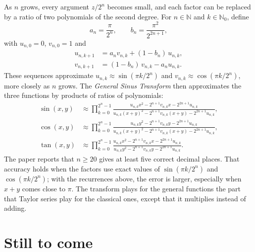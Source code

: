 As $n$ grows, every argument $z/2^n$ becomes small, and each factor can be replaced by a ratio of two polynomials of the second degree. For $n \in \mathbb{N}$ and $k \in \mathbb{N}_0$, define
\begin{equation}
a_n = \frac{\pi}{2^n}, \qquad b_n = \frac{\pi^2}{2^{2n+1}},
\end{equation}
with $u_{n,0} = 0$, $v_{n,0} = 1$ and
\begin{align}
u_{n,k+1} &= a_n v_{n,k} + (1 - b_n)\,u_{n,k}, \\
v_{n,k+1} &= (1 - b_n)\,v_{n,k} - a_n u_{n,k}.
\end{align}
These sequences approximate $u_{n,k} \approx \sin(\pi k/2^n)$ and $v_{n,k} \approx \cos(\pi k/2^n)$, more closely as $n$ grows. The \emph{General Sinus Transform} then approximates the three functions by products of ratios of polynomials:
\begin{align}
\sin(x, y) &\approx \prod_{k=0}^{2^n - 1} \frac{u_{n,k}x^2 - 2^{n+1}v_{n,k}x - 2^{2n+1}u_{n,k}}{u_{n,k}(x + y)^2 - 2^{n+1}v_{n,k}(x + y) - 2^{2n+1}u_{n,k}}, \\
\cos(x, y) &\approx \prod_{k=0}^{2^n - 1} \frac{u_{n,k}y^2 - 2^{n+1}v_{n,k}y - 2^{2n+1}u_{n,k}}{u_{n,k}(x + y)^2 - 2^{n+1}v_{n,k}(x + y) - 2^{2n+1}u_{n,k}}, \\
\tan(x, y) &\approx \prod_{k=0}^{2^n - 1} \frac{u_{n,k}x^2 - 2^{n+1}v_{n,k}x - 2^{2n+1}u_{n,k}}{u_{n,k}y^2 - 2^{n+1}v_{n,k}y - 2^{2n+1}u_{n,k}} .
\end{align}
The paper reports that $n \geq 20$ gives at least five correct decimal places. That accuracy holds when the factors use exact values of $\sin(\pi k/2^n)$ and $\cos(\pi k/2^n)$; with the recurrences above, the error is larger, especially when $x + y$ comes close to $\pi$. The transform plays for the general functions the part that Taylor series play for the classical ones, except that it multiplies instead of adding.

\section*{Still to come}

